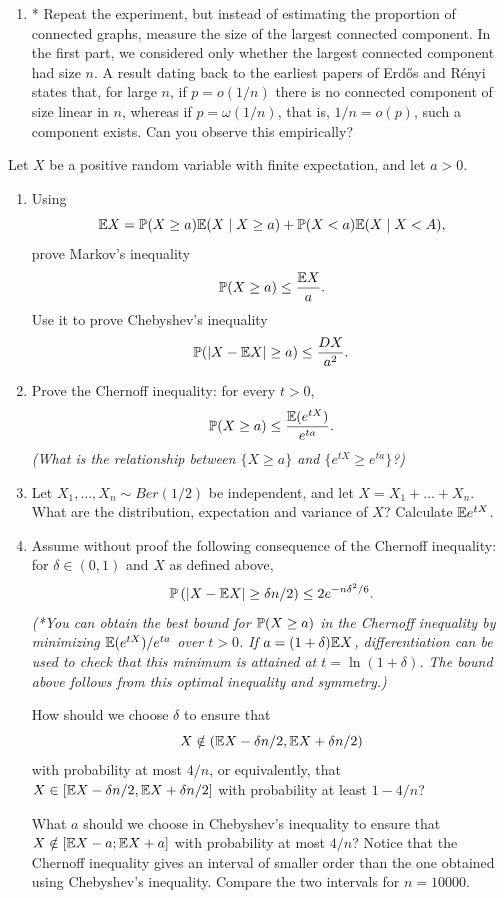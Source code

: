 \documentclass[a4paper]{report}
\begin{document}
\begin{problem}
\begin{enumerate}
Do you notice anything? Consider values of $p$ that are $o(\ln n/n)$, such as $\ln(\ln(n))/n$, and values that are $\omega(\ln n/n)$, such as $(n/2)/n=1/2$.
\item* Repeat the experiment, but instead of estimating the proportion of connected graphs, measure the size of the largest connected component. In the first part, we considered only whether the largest connected component had size $n$. A result dating back to the earliest papers of Erd\H{o}s and R\'enyi states that, for large $n$, if $p=o(1/n)$ there is no connected component of size linear in $n$, whereas if $p=\omega(1/n)$, that is, $1/n=o(p)$, such a component exists. Can you observe this empirically?
\end{enumerate}
\end{problem}
\begin{problem}
Let $X$ be a positive random variable with finite expectation, and let $a>0$.
\begin{enumerate}
\item Using
\[\E X=\P(X\geq a)\E(X\mid X\geq a)+\P(X<a)\E(X\mid X<A),\]
prove Markov's inequality
\[\P(X\geq a)\leq\frac{\E X}{a}.\]
Use it to prove Chebyshev's inequality
\[\P(|X-\E X|\geq a)\leq\frac{DX}{a^2}.\]
\item Prove the Chernoff inequality: for every $t>0$,
\[\P(X\geq a)\leq\frac{\E(e^{tX})}{e^{ta}}.\]
\textit{(What is the relationship between $\{X\geq a\}$ and $\{e^{tX}\geq e^{ta}\}$?)}
\item Let $X_1,\dots,X_n\sim Ber(1/2)$ be independent, and let $X=X_1+\dots+X_n$. What are the distribution, expectation and variance of $X$? Calculate $\E e^{tX}$.
\item Assume without proof the following consequence of the Chernoff inequality: for $\delta\in(0,1)$ and $X$ as defined above,
\[\P\left(|X-\E X|\geq\delta n/2\right)\leq2e^{-n\delta^2/6}.\]
\textit{(*You can obtain the best bound for $\P(X\geq a)$ in the Chernoff inequality by minimizing $\E(e^{tX})/e^{ta}$ over $t>0$. If $a=(1+\delta)\E X$, differentiation can be used to check that this minimum is attained at $t=\ln(1+\delta)$. The bound above follows from this optimal inequality and symmetry.)}

How should we choose $\delta$ to ensure that
\[X\notin(\E X-\delta n/2,\E X+\delta n/2)\]
with probability at most $4/n$, or equivalently, that $X\in[\E X-\delta n/2,\E X+\delta n/2]$ with probability at least $1-4/n$?

What $a$ should we choose in Chebyshev's inequality to ensure that $X\notin[\E X-a;\E X+a]$ with probability at most $4/n$?
Notice that the Chernoff inequality gives an interval of smaller order than the one obtained using Chebyshev's inequality. Compare the two intervals for $n=10000$.
\end{enumerate}
\end{problem}
\end{document}
